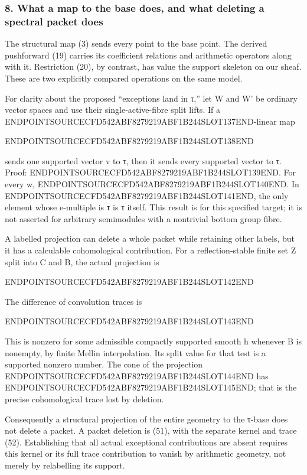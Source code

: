 \subsubsection{8. What a map to the base does, and what deleting a spectral packet does}\label{endpoint-tau_base--what-a-map-to-the-base-does-and-what-deleting-a-spectral-packet-does}

The structural map (3) sends every point to the base point. The derived pushforward (19) carries its coefficient relations and arithmetic operators along with it. Restriction (20), by contrast, has value the support skeleton on our sheaf. These are two explicitly compared operations on the same model.

For clarity about the proposed ``exceptions land in τ,'' let W and W' be ordinary vector spaces and use their single-active-fibre split lifts. If a ENDPOINTSOURCECFD542ABF8279219ABF1B244SLOT137END-linear map

ENDPOINTSOURCECFD542ABF8279219ABF1B244SLOT138END

sends one supported vector v to τ, then it sends every supported vector to τ. Proof: ENDPOINTSOURCECFD542ABF8279219ABF1B244SLOT139END. For every w, ENDPOINTSOURCECFD542ABF8279219ABF1B244SLOT140END. In ENDPOINTSOURCECFD542ABF8279219ABF1B244SLOT141END, the only element whose e-multiple is τ is τ itself. This result is for this specified target; it is not asserted for arbitrary semimodules with a nontrivial bottom group fibre.

A labelled projection can delete a whole packet while retaining other labels, but it has a calculable cohomological contribution. For a reflection-stable finite set Z split into C and B, the actual projection is

ENDPOINTSOURCECFD542ABF8279219ABF1B244SLOT142END

The difference of convolution traces is

ENDPOINTSOURCECFD542ABF8279219ABF1B244SLOT143END

This is nonzero for some admissible compactly supported smooth h whenever B is nonempty, by finite Mellin interpolation. Its split value for that test is a supported nonzero number. The cone of the projection ENDPOINTSOURCECFD542ABF8279219ABF1B244SLOT144END has ENDPOINTSOURCECFD542ABF8279219ABF1B244SLOT145END; that is the precise cohomological trace lost by deletion.

Consequently a structural projection of the entire geometry to the τ-base does not delete a packet. A packet deletion is (51), with the separate kernel and trace (52). Establishing that all actual exceptional contributions are absent requires this kernel or its full trace contribution to vanish by arithmetic geometry, not merely by relabelling its support.

